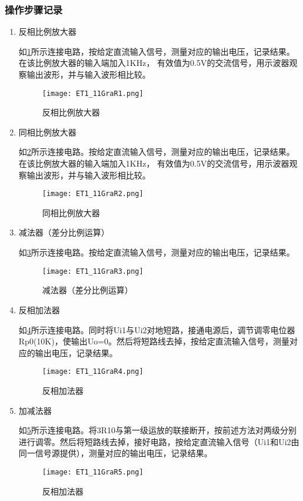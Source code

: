 \documentclass[dvipsnames, svgnames,a4paper,11pt]{article}
\begin{document}
	\subsubsection{操作步骤记录}
	\begin{enumerate}
		\item 反相比例放大器
		
		如\cref{fig:figR1}所示连接电路，按给定直流输入信号，测量对应的输出电压，记录结果。在该比例放大器的输入端加入1KHz， 有效值为0.5V的交流信号，用示波器观察输出波形，并与输入波形相比较。
		
		\begin{figure}[htbp]
			\centering
			\texttt{[image: ET1\_11GraR1.png]}
			\caption{反相比例放大器}
			\label{fig:figR1}
		\end{figure}
		
		\item 同相比例放大器
		
		如\cref{fig:figR2}所示连接电路。按给定直流输入信号，测量对应的输出电压，记录结果。在该比例放大器的输入端加入1KHz， 有效值为0.5V的交流信号，用示波器观察输出波形，并与输入波形相比较。
		
		\begin{figure}[htbp]
			\centering
			\texttt{[image: ET1\_11GraR2.png]}
			\caption{同相比例放大器}
			\label{fig:figR2}
		\end{figure}
		
		\item 减法器（差分比例运算）
		
		如\cref{fig:figR3}所示连接电路。按给定直流输入信号，测量对应的输出电压，记录结果。
		
		\begin{figure}[htbp]
			\centering
			\texttt{[image: ET1\_11GraR3.png]}
			\caption{减法器（差分比例运算）}
			\label{fig:figR3}
		\end{figure}
		
		\item 反相加法器
		
		如\cref{fig:figR4}所示连接电路。同时将Ui1与Ui2对地短路，接通电源后，调节调零电位器Rp0(10K)，使输出Uo=0。然后将短路线去掉，按给定直流输入信号，测量对应的输出电压，记录结果。
		
		\begin{figure}[htbp]
			\centering
			\texttt{[image: ET1\_11GraR4.png]}
			\caption{反相加法器}
			\label{fig:figR4}
		\end{figure}
		
		\item 加减法器
		
		如\cref{fig:figR5}所示连接电路。将3R10与第一级运放的联接断开，按前述方法对两级分别进行调零。然后将短路线去掉，接好电路，按给定直流输入信号（Ui1和Ui2由同一信号源提供），测量对应的输出电压，记录结果。
		
		\begin{figure}[htbp]
			\centering
			\texttt{[image: ET1\_11GraR5.png]}
			\caption{反相加法器}
			\label{fig:figR5}
		\end{figure}
		
	\end{enumerate}	
	
\end{document}
